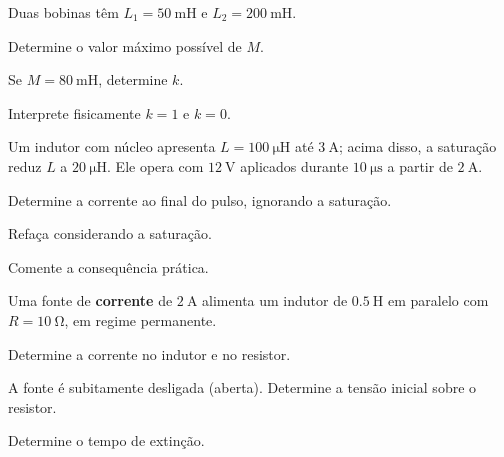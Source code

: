 \begin{questao}[3]{}

Duas bobinas têm $L_1=\SI{50}{\milli\henry}$ e $L_2=\SI{200}{\milli\henry}$.
\begin{itensq}
\item Determine o valor máximo possível de $M$.
\item Se $M=\SI{80}{\milli\henry}$, determine $k$.
\item Interprete fisicamente $k=1$ e $k=0$.
\end{itensq}


\end{questao}
\begin{questao}[3]{}

Um indutor com núcleo apresenta $L=\SI{100}{\micro\henry}$ até
$\SI{3}{\ampere}$; acima disso, a saturação reduz $L$ a
$\SI{20}{\micro\henry}$. Ele opera com $\SI{12}{\volt}$ aplicados durante
$\SI{10}{\micro\second}$ a partir de $\SI{2}{\ampere}$.
\begin{itensq}
\item Determine a corrente ao final do pulso, ignorando a saturação.
\item Refaça considerando a saturação.
\item Comente a consequência prática.
\end{itensq}


\end{questao}
\begin{questao}[3]{}

Uma fonte de \textbf{corrente} de $\SI{2}{\ampere}$ alimenta um indutor de
$\SI{0.5}{\henry}$ em paralelo com $R=\SI{10}{\ohm}$, em regime permanente.
\begin{itensq}
\item Determine a corrente no indutor e no resistor.
\item A fonte é subitamente desligada (aberta). Determine a tensão inicial
      sobre o resistor.
\item Determine o tempo de extinção.
\end{itensq}


\end{questao}

